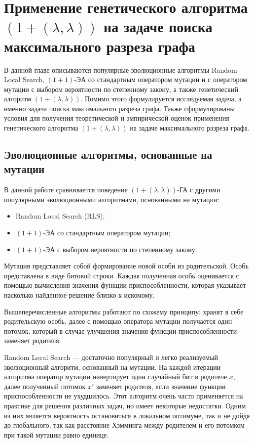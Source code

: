 \documentclass[times]{itmo-student-thesis}
\newcommand{\alglambda}{${(1 + (\lambda , \lambda))}$\xspace}
\newcommand{\alglambdaf}{${(1 + (\lambda , \lambda))}$-ГА\xspace}
\newcommand{\oea}{\mbox{$(1 + 1)$-ЭА}\xspace}
\begin{document}
\chapter{Применение генетического алгоритма \alglambda на задаче поиска максимального разреза графа}

\startrelatedwork
В данной главе описываются популярные эволюционные алгоритмы Random Local Search, \oea со стандартным оператором мутации и с оператором мутации с выбором вероятности по степенному закону, а также генетический алгоритм \alglambda. Помимо этого формулируется исследуемая задача, а именно задача поиска максимального разреза графа.
Также сформулированы условия для получения теоретической и эмпирической оценок применения генетического алгоритма \alglambda на задаче максимального разреза графа.
\finishrelatedwork

\section{Эволюционные алгоритмы, основанные на мутации}
В данной работе сравнивается поведение \alglambdaf с другими популярными эволюционными алгоритмами, основанными на мутации:
\begin{itemize}
  \item Random Local Search (RLS);
  \item \oea со стандартным оператором мутации;
  \item \oea с выбором вероятности по степенному закону.
\end{itemize}

Мутация представляет собой формирование новой особи из родительской. Особь представлена в виде битовой строки. Каждая полученная особь оценивается с помощью вычисления значения  функции приспособленности, которая указывает насколько найденное решение близко к искомому.

Вышеперечисленные алгоритмы работают по схожему принципу: хранят в себе родительскую особь, далее с помощью оператора мутации получается один потомок, который в случае улучшения значения функции приспособленности заменяет родителя.

Random Local Search --- достаточно популярный и легко реализуемый  эволюционный алгоритм, основанный на мутации. На каждой итерации алгоритма оператор мутации инвертирует один случайный бит в родителе $x$, далее
полученный потомок $x'$ заменяет родителя, если значение функции приспособленности не ухудшилось. Этот алгоритм очень часто применяется на практике для решения различных задач, но имеет некоторые недостатки. Одним из них является вероятность остановиться в локальном оптимуме, так и не дойдя до глобального, так как расстояние Хэмминга между родителем и его потомком при такой мутации равно единице.
\end{document}
